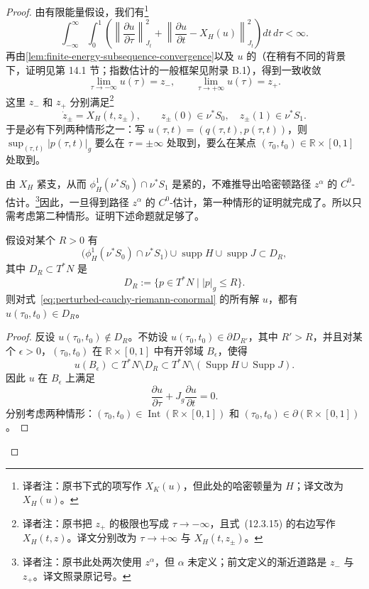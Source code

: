 \begin{proof}
由有限能量假设，我们有\footnote{译者注：原书下式的\personHamilton{}项写作 $X_K(u)$，但此处的哈密顿量为 $H$；译文改为 $X_H(u)$。}
\[
  \int_{-\infty}^{\infty}\!\int_0^1
  \left(
    \left\lVert\frac{\partial u}{\partial\tau}\right\rVert_{J_t}^2
    +\left\lVert\frac{\partial u}{\partial t}-X_H(u)\right\rVert_{J_t}^2
  \right)dt\,d\tau<\infty.
\]
再由\cref{lem:finite-energy-subsequence-convergence}以及 $u$ 的\termExponentialDecayEstimate{}（在稍有不同的背景下，证明见第 14.1 节；指数估计的一般框架见附录 B.1），得到一致收敛
\[
  \lim_{\tau\to-\infty}u(\tau)=z_-,
  \qquad
  \lim_{\tau\to+\infty}u(\tau)=z_+.
\]
这里 $z_-$ 和 $z_+$ 分别满足\footnote{译者注：原书把 $z_+$ 的极限也写成 $\tau\to-\infty$，且式~(12.3.15) 的右边写作 $X_H(t,z)$。译文分别改为 $\tau\to+\infty$ 与 $X_H(t,z_\pm)$。}
\begin{equation}
  \dot z_\pm=X_H(t,z_\pm),
  \qquad
  z_\pm(0)\in\nu^*S_0,
  \quad z_\pm(1)\in\nu^*S_1.
  \label{eq:asymptotic-hamiltonian-paths}
\end{equation}
于是必有下列两种情形之一：写 $u(\tau,t)=(q(\tau,t),p(\tau,t))$，则 $\sup_{(\tau,t)}|p(\tau,t)|_g$ 要么在 $\tau=\pm\infty$ 处取到，要么在某点 $(\tau_0,t_0)\in\mathbb R\times[0,1]$ 处取到。

由 $X_H$ 紧支，从而 $\phi_H^1(\nu^*S_0)\cap\nu^*S_1$ 是紧的，不难推导出哈密顿路径 $z^\alpha$ 的 $C^0$-估计。\footnote{译者注：原书此处两次使用 $z^\alpha$，但 $\alpha$ 未定义；前文定义的渐近道路是 $z_-$ 与 $z_+$。译文照录原记号。}因此，一旦得到路径 $z^\alpha$ 的 $C^0$-估计，第一种情形的证明就完成了。所以只需考虑第二种情形。证明下述命题就足够了。

\begin{proposition}
\label{prop:maximum-principle-disc-bundle}
假设对某个 $R>0$ 有
\[
  \bigl(\phi_H^1(\nu^*S_0)\cap\nu^*S_1\bigr)
  \cup\operatorname{supp}H\cup\operatorname{supp}J
  \subset D_R,
\]
其中 $D_R\subset T^*N$ 是\termDiscBundle{}
\[
  D_R:=\{p\in T^*N\mid |p|_g\le R\}.
\]
则对式~\eqref{eq:perturbed-cauchy-riemann-conormal} 的所有解 $u$，都有 $u(\tau_0,t_0)\in D_R$。
\end{proposition}

\begin{proof}
反设 $u(\tau_0,t_0)\notin D_R$。不妨设 $u(\tau_0,t_0)\in\partial D_{R'}$，其中 $R'>R$，并且对某个 $\epsilon>0$，$(\tau_0,t_0)$ 在 $\mathbb R\times[0,1]$ 中有开邻域 $B_\epsilon$，使得
\[
  u(B_\epsilon)
  \subset T^*N\setminus D_R
  \subset T^*N\setminus(\operatorname{Supp}H\cup\operatorname{Supp}J).
\]
因此 $u$ 在 $B_\epsilon$ 上满足
\[
  \frac{\partial u}{\partial\tau}
  +J_g\frac{\partial u}{\partial t}=0.
\]
分别考虑两种情形：$(\tau_0,t_0)\in\operatorname{Int}(\mathbb R\times[0,1])$ 和 $(\tau_0,t_0)\in\partial(\mathbb R\times[0,1])$。


\end{proof}
\end{proof}
